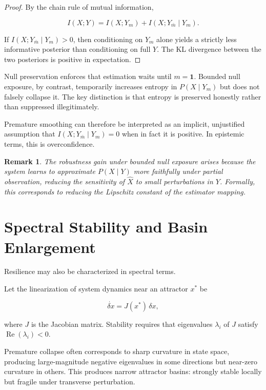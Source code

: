 \documentclass[11pt]{article}
\newtheorem{remark}{Remark}
\theoremstyle{remark}
\begin{document}
\begin{proof}
By the chain rule of mutual information,

\[
I(X; Y) = I(X; Y_m) + I(X; Y_{\bar m} \mid Y_m).
\]

If $I(X; Y_{\bar m} \mid Y_m) > 0$, then conditioning on $Y_m$ alone yields a strictly less informative posterior than conditioning on full $Y$. The KL divergence between the two posteriors is positive in expectation.
\end{proof}

Null preservation enforces that estimation waits until $m = \mathbf{1}$. Bounded null exposure, by contrast, temporarily increases entropy in $P(X \mid Y_m)$ but does not falsely collapse it. The key distinction is that entropy is preserved honestly rather than suppressed illegitimately.

Premature smoothing can therefore be interpreted as an implicit, unjustified assumption that $I(X; Y_{\bar m} \mid Y_m) = 0$ when in fact it is positive. In epistemic terms, this is overconfidence.

\begin{remark}
The robustness gain under bounded null exposure arises because the system learns to approximate $P(X \mid Y)$ more faithfully under partial observation, reducing the sensitivity of $\hat{X}$ to small perturbations in $Y$. Formally, this corresponds to reducing the Lipschitz constant of the estimator mapping.
\end{remark}

\section{Spectral Stability and Basin Enlargement}
\label{sec:spectral}

Resilience may also be characterized in spectral terms.

Let the linearization of system dynamics near an attractor $x^*$ be

\[
\dot{\delta x} = J(x^*) \, \delta x,
\]

where $J$ is the Jacobian matrix. Stability requires that eigenvalues $\lambda_i$ of $J$ satisfy $\operatorname{Re}(\lambda_i) < 0$.

Premature collapse often corresponds to sharp curvature in state space, producing large-magnitude negative eigenvalues in some directions but near-zero curvature in others. This produces narrow attractor basins: strongly stable locally but fragile under transverse perturbation.
\end{document}
